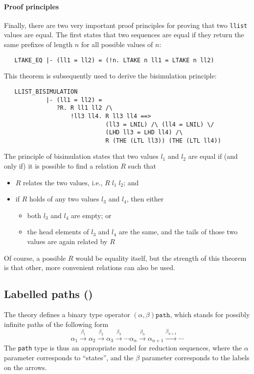 \paragraph{Proof principles}

Finally, there are two very important proof principles for proving
that two \texttt{llist} values are equal.  The first states that two
sequences are equal if they return the same prefixes of length $n$ for
all possible values of $n$:
{\small
\begin{verbatim}
   LTAKE_EQ |- (ll1 = ll2) = (!n. LTAKE n ll1 = LTAKE n ll2)
\end{verbatim}
}
\noindent This theorem is subsequently used to derive the bisimulation
principle:
{
\small
\begin{verbatim}
   LLIST_BISIMULATION
            |- (ll1 = ll2) =
               ?R. R ll1 ll2 /\
                   !ll3 ll4. R ll3 ll4 ==>
                             (ll3 = LNIL) /\ (ll4 = LNIL) \/
                             (LHD ll3 = LHD ll4) /\
                             R (THE (LTL ll3)) (THE (LTL ll4))
\end{verbatim}
}
The principle of bisimulation states that two  values $l_1$
and $l_2$ are equal if (and only if) it is possible to find a
relation $R$ such that
\begin{itemize}
\item $R$ relates the two values, i.e., $R\;l_1\;l_2$; and
\item if $R$ holds of any two values $l_3$ and $l_4$, then either
  \begin{itemize}
  \item both $l_3$ and $l_4$ are empty; or
  \item the head elements of $l_3$ and $l_4$ are the same, and the
    tails of those two values are again related by $R$
  \end{itemize}
\end{itemize}
Of course, a possible $R$ would be equality itself, but the strength
of this theorem is that other, more convenient relations can also be
used.
\index{lazy lists@``lazy'' lists!\HOL{} theory of|)}

\subsection{Labelled paths ()}

The theory \theoryimp{path}
defines a binary type operator $(\alpha,\beta)\texttt{path}$, which
stands for possibly infinite paths of the following form
\[
  \alpha_1 \stackrel{\beta_1}{\longrightarrow}
  \alpha_2 \stackrel{\beta_2}{\longrightarrow}
  \alpha_3 \stackrel{\beta_3}{\longrightarrow} \cdots
  \alpha_n \stackrel{\beta_n}{\longrightarrow}
  \alpha_{n+1} \stackrel{\beta_{n+1}}{\longrightarrow}  \cdots
  \]
The \texttt{path} type is thus an appropriate model for reduction
sequences, where the $\alpha$ parameter corresponds to ``states'', and
the $\beta$ parameter corresponds to the labels on the arrows.


